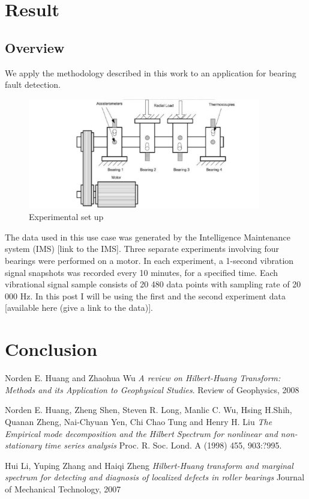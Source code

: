 \documentclass[11pt, oneside]{article}   	%
\begin{document}
\section{Result}
\subsection{Overview}
We apply the methodology described in this work to an application for bearing fault detection.
\begin{figure}[H] %
   \centering
   \includegraphics[width=4in]{experiment} 
   \caption{Experimental set up}
   \label{fig:exp}
\end{figure}
The data used in this use case was generated by the Intelligence Maintenance system (IMS) [link to the IMS].
Three separate experiments involving four bearings were performed on a motor. In each experiment, a 1-second vibration signal snapshots was recorded every 10 minutes, for a specified time. Each vibrational signal sample consists of 20 480 data points with sampling rate of 20 000 Hz.
In this post I will be using the first and the second experiment data [available here (give a link to the data)].


\section{Conclusion}
\begin{thebibliography}{9}
Norden E. Huang and Zhaohua Wu 
\textit{A review on Hilbert-Huang Transform: Methods and its Application to Geophysical Studies}. 
Review of Geophysics, 2008
 
Norden E. Huang, Zheng Shen, Steven R. Long, Manlic C. Wu, Hsing H.Shih, Quanan Zheng, Nai-Chyuan Yen, Chi Chao Tung and Henry H. Liu
\textit{The Empirical mode decomposition and the Hilbert Spectrum for nonlinear and non-stationary time series analysis}
Proc. R. Soc. Lond. A (1998) 455, 903:?995.
 
Hui Li, Yuping Zhang and Haiqi Zheng
\textit{Hilbert-Huang transform and marginal spectrum for detecting and diagnosis of localized defects in roller bearings}
Journal of Mechanical Technology, 2007
\end{thebibliography}
\end{document}
